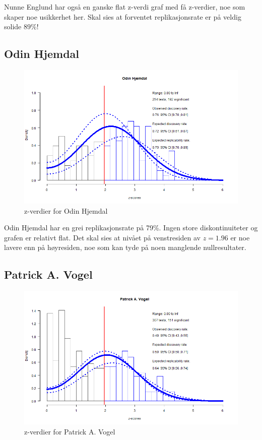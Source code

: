 \documentclass[doc,norsk]{apa7}
\begin{document}
Nunne Englund har også en ganske flat z-verdi graf med få z-verdier, noe som skaper noe usikkerhet her. Skal sies at forventet replikasjonsrate er på veldig solide $89\%$!

\subsection{Odin Hjemdal}
\begin{figure}[h!]
    \centering
    \includegraphics[width=\textwidth]{images/Odin Hjemdal.png}
    \caption{z-verdier for Odin Hjemdal}
\end{figure}

Odin Hjemdal har en grei replikasjonsrate på 79\%. Ingen store diskontinuiteter og grafen er relativt flat. Det skal sies at nivået på venstresiden av $z=1.96$ er noe lavere enn på høyresiden, noe som kan tyde på noen manglende nullresultater.

\subsection{Patrick A. Vogel}
\begin{figure}[h!]
    \centering
    \includegraphics[width=\textwidth]{images/Patrick A. Vogel.png}
    \caption{z-verdier for Patrick A. Vogel}
\end{figure}
\end{document}
